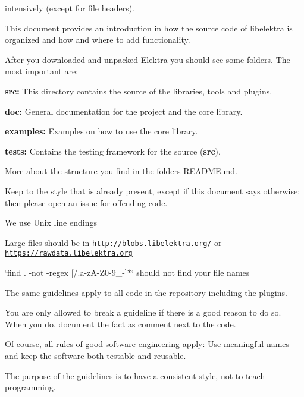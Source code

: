 intensively (except for file headers).

This document provides an introduction in how the source code of libelektra is organized and how and where to add functionality.

After you downloaded and unpacked Elektra you should see some folders. The most important are\+:


\begin{DoxyItemize}
\item {\bfseries src\+:} This directory contains the source of the libraries, tools and plugins.
\item {\bfseries doc\+:} General documentation for the project and the core library.
\item {\bfseries examples\+:} Examples on how to use the core library.
\item {\bfseries tests\+:} Contains the testing framework for the source ({\bfseries src}).
\end{DoxyItemize}

More about the structure you find in the folder\textquotesingle{}s {\ttfamily R\+E\+A\+D\+M\+E.\+md}.


\begin{DoxyItemize}
\item Keep to the style that is already present, except if this document says otherwise\+: then please open an issue for offending code.
\item We use Unix line endings
\item Large files should be in \href{http://blobs.libelektra.org/}{\tt http\+://blobs.\+libelektra.\+org/} or \href{https://rawdata.libelektra.org}{\tt https\+://rawdata.\+libelektra.\+org}
\item `find . -\/not -\/regex \textquotesingle{}\mbox{[}/.a-\/z\+A-\/\+Z0-\/9\+\_\+-\/\mbox{]}$\ast$\textquotesingle{}` should not find your file names
\end{DoxyItemize}

The same guidelines apply to all code in the repository including the plugins.

You are only allowed to break a guideline if there is a good reason to do so. When you do, document the fact as comment next to the code.

Of course, all rules of good software engineering apply\+: Use meaningful names and keep the software both testable and reusable.

The purpose of the guidelines is to have a consistent style, not to teach programming.

